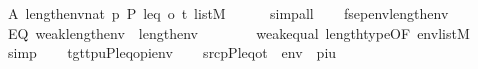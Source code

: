 \begin{isabellebody}
\ A{\isacharcolon}{\kern0pt}\ {\isachardoublequoteopen}{}{\isacharhash}{\kern0pt}{\isacharplus}{\kern0pt}length{\isacharparenleft}{\kern0pt}env{\isacharparenright}{\kern0pt}{\isasymin}nat{\isachardoublequoteclose}\ {\isachardoublequoteopen}{\isacharbrackleft}{\kern0pt}p{\isacharcomma}{\kern0pt}\ P{\isacharcomma}{\kern0pt}\ leq{\isacharcomma}{\kern0pt}\ o{\isacharcomma}{\kern0pt}\ t{\isacharbrackright}{\kern0pt}\ {\isasymin}list{\isacharparenleft}{\kern0pt}M{\isacharparenright}{\kern0pt}{\isachardoublequoteclose}\isanewline
\ \ \ \ \isamarkupfalse%
\ simp{\isacharunderscore}{\kern0pt}all\isanewline
\ \ \isamarkupfalse%
\ {\isacharquery}{\kern0pt}f{\isacharequal}{\kern0pt}{\isachardoublequoteopen}sep{\isacharunderscore}{\kern0pt}env{\isacharparenleft}{\kern0pt}length{\isacharparenleft}{\kern0pt}env{\isacharparenright}{\kern0pt}{\isacharparenright}{\kern0pt}{\isachardoublequoteclose}\isanewline
\ \ \isamarkupfalse%
\ EQ{\isacharcolon}{\kern0pt}\ {\isachardoublequoteopen}weak{\isacharparenleft}{\kern0pt}length{\isacharparenleft}{\kern0pt}env{\isacharparenright}{\kern0pt}{\isacharcomma}{\kern0pt}{}{\isacharparenright}{\kern0pt}\ {\isacharequal}{\kern0pt}\ {}{\isacharhash}{\kern0pt}{\isacharplus}{\kern0pt}length{\isacharparenleft}{\kern0pt}env{\isacharparenright}{\kern0pt}\ {\isacharminus}{\kern0pt}\ {}{\isachardoublequoteclose}\isanewline
\ \ \ \ \isamarkupfalse%
\ weak{\isacharunderscore}{\kern0pt}equal\ length{\isacharunderscore}{\kern0pt}type{\isacharbrackleft}{\kern0pt}OF\ {\isacartoucheopen}env{\isasymin}list{\isacharparenleft}{\kern0pt}M{\isacharparenright}{\kern0pt}{\isacartoucheclose}{\isacharbrackright}{\kern0pt}\ \isamarkupfalse%
\ simp\isanewline
\ \ \isamarkupfalse%
\ {\isacharquery}{\kern0pt}tgt{\isacharequal}{\kern0pt}{\isachardoublequoteopen}{\isacharbrackleft}{\kern0pt}t{\isacharcomma}{\kern0pt}p{\isacharcomma}{\kern0pt}u{\isacharcomma}{\kern0pt}P{\isacharcomma}{\kern0pt}leq{\isacharcomma}{\kern0pt}o{\isacharcomma}{\kern0pt}pi{\isacharbrackright}{\kern0pt}{\isacharat}{\kern0pt}env{\isachardoublequoteclose}\isanewline
\ \ \isamarkupfalse%
\ {\isacharquery}{\kern0pt}src{\isacharequal}{\kern0pt}{\isachardoublequoteopen}{\isacharbrackleft}{\kern0pt}p{\isacharcomma}{\kern0pt}P{\isacharcomma}{\kern0pt}leq{\isacharcomma}{\kern0pt}o{\isacharcomma}{\kern0pt}t{\isacharbrackright}{\kern0pt}\ {\isacharat}{\kern0pt}\ env\ {\isacharat}{\kern0pt}\ {\isacharbrackleft}{\kern0pt}pi{\isacharcomma}{\kern0pt}u{\isacharbrackright}{\kern0pt}{\isachardoublequoteclose}\isanewline

\end{isabellebody}
